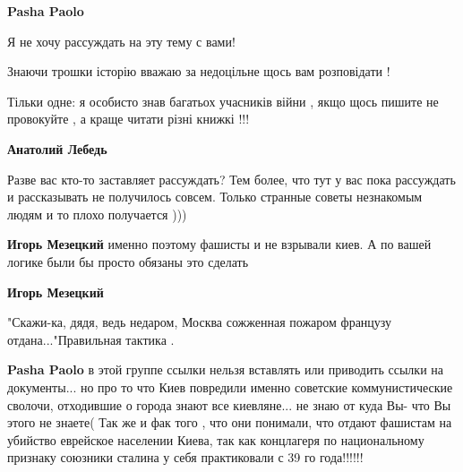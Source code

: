 \begin{itemize}
\begin{itemize}
\begin{itemize}
 
\textbf{Pasha Paolo}

Я не хочу рассуждать на эту тему с вами!

Знаючи трошки історію вважаю за недоцільне щось вам розповідати !

Тільки одне: я особисто знав багатьох учасників війни , якщо щось пишите не
провокуйте , а краще читати різні книжкі !!!


 
\textbf{Анатолий Лебедь} 

Разве вас кто-то заставляет рассуждать? Тем более, что тут у вас пока рассуждать
и рассказывать не получилось совсем. Только странные советы незнакомым людям и
то плохо получается )))

 
\textbf{Игорь Мезецкий} именно поэтому фашисты и не взрывали киев. А по вашей логике были бы просто обязаны это сделать


 
\textbf{Игорь Мезецкий} 

"Скажи-ка, дядя, ведь недаром, Москва сожженная пожаром французу
отдана..."Правильная тактика .

 
\textbf{Pasha Paolo} в этой группе ссылки нельзя вставлять или приводить ссылки
на документы... но про то что Киев повредили именно советские коммунистические
сволочи, отходившие о города знают все киевляне... не знаю от куда Вы- что Вы
этого не знаете( Так же и фак того , что они понимали, что отдают фашистам на
убийство еврейское населении Киева, так как концлагеря по национальному
признаку союзники сталина у себя практиковали с 39 го года!!!!!!


\end{itemize}
\end{itemize}
\end{itemize}
